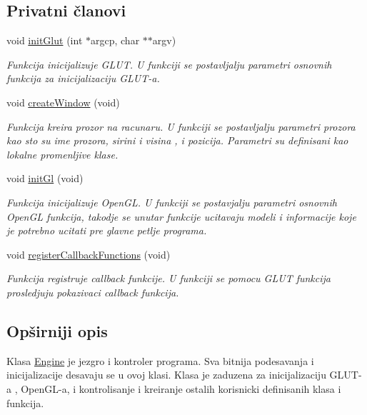 \subsection*{Privatni članovi}
\begin{DoxyCompactItemize}
\item 
void \hyperlink{classcore_1_1Engine_a737de95b00aa5b62c466f2e3dc4edcdb}{init\+Glut} (int $\ast$argcp, char $\ast$$\ast$argv)
\begin{DoxyCompactList}\small\item\em Funkcija inicijalizuje G\+L\+UT. U funkciji se postavljalju parametri osnovnih funkcija za inicijalizaciju G\+L\+U\+T-\/a. \end{DoxyCompactList}\item 
void \hyperlink{classcore_1_1Engine_ad6d0e175eff6ec04d3e5af53a78443ef}{create\+Window} (void)
\begin{DoxyCompactList}\small\item\em Funkcija kreira prozor na racunaru. U funkciji se postavljalju parametri prozora kao sto su ime prozora, sirini i visina , i pozicija. Parametri su definisani kao lokalne promenljive klase. \end{DoxyCompactList}\item 
void \hyperlink{classcore_1_1Engine_a6cfe680acf87f9882f92b1ffc134021f}{init\+Gl} (void)
\begin{DoxyCompactList}\small\item\em Funkcija inicijalizuje Open\+GL. U funkciji se postavjalju parametri osnovnih Open\+GL funkcija, takodje se unutar funkcije ucitavaju modeli i informacije koje je potrebno ucitati pre glavne petlje programa. \end{DoxyCompactList}\item 
void \hyperlink{classcore_1_1Engine_a4a8c96ce1172195507d2233479837ad2}{register\+Callback\+Functions} (void)
\begin{DoxyCompactList}\small\item\em Funkcija registruje callback funkcije. U funkciji se pomocu G\+L\+UT funkcija prosledjuju pokazivaci callback funkcija. \end{DoxyCompactList}\end{DoxyCompactItemize}


\subsection{Opširniji opis}
Klasa \hyperlink{classcore_1_1Engine}{Engine} je jezgro i kontroler programa. Sva bitnija podesavanja i inicijalizacije desavaju se u ovoj klasi. Klasa je zaduzena za inicijalizaciju G\+L\+U\+T-\/a , Open\+G\+L-\/a, i kontrolisanje i kreiranje ostalih korisnicki definisanih klasa i funkcija. 

